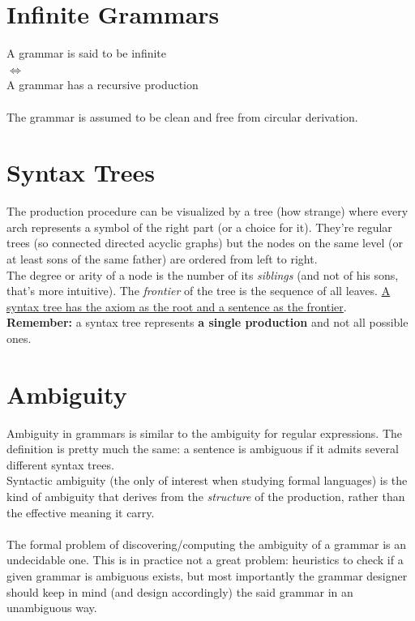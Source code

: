 \documentclass[10pt,a4paper]{article}
\begin{document}
        \section{Infinite Grammars}
            A grammar is said to be infinite\\
            $\Leftrightarrow$\\
            A grammar has a recursive production\\\\
            The grammar is assumed to be clean and free from circular derivation. 
	       
	    \section{Syntax Trees}
	    	The production procedure can be visualized by a tree (how strange) where every arch represents a symbol of the right part (or a choice for it). They're regular trees (so connected directed acyclic graphs) but the nodes on the same level (or at least sons of the same father) are ordered from left to right.\\
	    	The degree or arity of a node is the number of its \emph{siblings} (and not of his sons, that's more intuitive). The \emph{frontier} of the tree is the sequence of all leaves. \underline{A syntax tree has the axiom as the root and a sentence as the frontier}.\\
	    	\textbf{Remember:} a syntax tree represents \textbf{a single production} and not all possible ones.
		
		\section{Ambiguity}
			Ambiguity in grammars is similar to the ambiguity for regular expressions. The definition is pretty much the same: a sentence is ambiguous if it admits several different syntax trees.\\
			Syntactic ambiguity (the only of interest when studying formal languages) is the kind of ambiguity that derives from the \emph{structure} of the production, rather than the effective meaning it carry.\\\\
			The formal problem of discovering/computing the ambiguity of a grammar is an undecidable one. This is in practice not a great problem: heuristics to check if a given grammar is ambiguous exists, but most importantly the grammar designer should keep in mind (and design accordingly) the said grammar in an unambiguous way.
			
\end{document}
